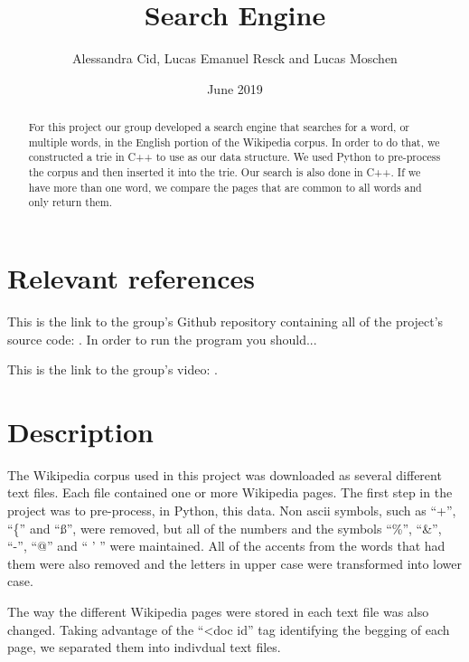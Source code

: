 \documentclass{article}
\title{Search Engine}
\author{Alessandra Cid, Lucas Emanuel Resck  
and Lucas Moschen}
\date{June 2019}
\begin{document}
\maketitle

\begin{abstract}
For this project our group developed a search engine that searches for a word, or multiple words, in the English portion of the Wikipedia corpus. In order to do that, we constructed a trie in C++ to use as our data structure. We used Python to pre-process the corpus and then inserted it into the trie. Our search is also done in C++. If we have more than one word, we compare the pages that are common to all words and only return them. 
\end{abstract}

\section*{Relevant references}
This is the link to the group's Github repository containing all of the project's 
source code: . In order to run the program you should...

This is the link to the group's video: . 

\section*{Description}
The Wikipedia corpus used in this project was downloaded as several different text files. Each file contained one or more Wikipedia pages. The first step in the project was to pre-process, in Python, this data. Non ascii symbols, such as ``+'', ``\{'' and ``ß'', were removed, but all of the numbers and the symbols ``\%'', ``\&'', ``-'', ``@'' and `` ' '' were maintained. All of the accents from the words that had them were also removed and the letters in upper case were transformed into lower case. 

The way the different Wikipedia pages were stored in each text file was also changed. Taking advantage of the ``<doc id'' tag identifying the begging of each page, we separated them into indivdual text files. 
\end{document}
